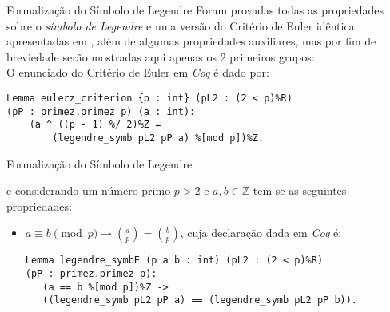 \begin{frame}[fragile]{Formalização do Símbolo de Legendre}
    Foram provadas todas as propriedades sobre o \textit{símbolo de Legendre} e uma versão do Critério de Euler idêntica apresentadas em \cite{book:2399854}, além de algumas propriedades auxiliares, mas por fim de breviedade serão mostradas aqui apenas os 2 primeiros grupos:
    \vspace{4mm}
    \\
    O enunciado do Critério de Euler em \textit{Coq} é dado por:
        \begin{lstlisting}[language=coq,frame=single,tabsize=1]
Lemma eulerz_criterion {p : int} (pL2 : (2 < p)%R) 
(pP : primez.primez p) (a : int):
    (a ^ ((p - 1) %/ 2)%Z = 
        (legendre_symb pL2 pP a) %[mod p])%Z.
        \end{lstlisting}

\end{frame}

\begin{frame}[fragile]{Formalização do Símbolo de Legendre}
    
    e considerando um número primo $p > 2$ e $a, b \in \mathbb{Z}$ tem-se as seguintes propriedades:
        
        \begin{itemize}
            \item $a \equiv b \pmod{p} \rightarrow \left(\frac{a}{p}\right) = \left(\frac{b}{p}\right)$, cuja declaração dada em \textit{Coq} é:
            \newline
                \begin{lstlisting}[language=coq,frame=single,tabsize=1]
Lemma legendre_symbE (p a b : int) (pL2 : (2 < p)%R) 
(pP : primez.primez p):
   (a == b %[mod p])%Z -> 
   ((legendre_symb pL2 pP a) == (legendre_symb pL2 pP b)).
                \end{lstlisting}

        \end{itemize}
\end{frame}


